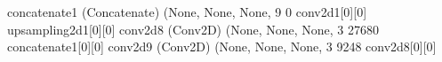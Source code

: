 \documentclass[letterpaper,10pt,english]{sphinxmanual}
\begin{document}
\begin{sphinxVerbatim}[commandchars=\\\{\}]
concatenate\PYGZus{}1 (Concatenate)     (None, None, None, 9 0           conv2d\PYGZus{}1[0][0]                   
                                                                 up\PYGZus{}sampling2d\PYGZus{}1[0][0]            
\PYGZus{}\PYGZus{}\PYGZus{}\PYGZus{}\PYGZus{}\PYGZus{}\PYGZus{}\PYGZus{}\PYGZus{}\PYGZus{}\PYGZus{}\PYGZus{}\PYGZus{}\PYGZus{}\PYGZus{}\PYGZus{}\PYGZus{}\PYGZus{}\PYGZus{}\PYGZus{}\PYGZus{}\PYGZus{}\PYGZus{}\PYGZus{}\PYGZus{}\PYGZus{}\PYGZus{}\PYGZus{}\PYGZus{}\PYGZus{}\PYGZus{}\PYGZus{}\PYGZus{}\PYGZus{}\PYGZus{}\PYGZus{}\PYGZus{}\PYGZus{}\PYGZus{}\PYGZus{}\PYGZus{}\PYGZus{}\PYGZus{}\PYGZus{}\PYGZus{}\PYGZus{}\PYGZus{}\PYGZus{}\PYGZus{}\PYGZus{}\PYGZus{}\PYGZus{}\PYGZus{}\PYGZus{}\PYGZus{}\PYGZus{}\PYGZus{}\PYGZus{}\PYGZus{}\PYGZus{}\PYGZus{}\PYGZus{}\PYGZus{}\PYGZus{}\PYGZus{}\PYGZus{}\PYGZus{}\PYGZus{}\PYGZus{}\PYGZus{}\PYGZus{}\PYGZus{}\PYGZus{}\PYGZus{}\PYGZus{}\PYGZus{}\PYGZus{}\PYGZus{}\PYGZus{}\PYGZus{}\PYGZus{}\PYGZus{}\PYGZus{}\PYGZus{}\PYGZus{}\PYGZus{}\PYGZus{}\PYGZus{}\PYGZus{}\PYGZus{}\PYGZus{}\PYGZus{}\PYGZus{}\PYGZus{}\PYGZus{}\PYGZus{}\PYGZus{}\PYGZus{}
conv2d\PYGZus{}8 (Conv2D)               (None, None, None, 3 27680       concatenate\PYGZus{}1[0][0]              
\PYGZus{}\PYGZus{}\PYGZus{}\PYGZus{}\PYGZus{}\PYGZus{}\PYGZus{}\PYGZus{}\PYGZus{}\PYGZus{}\PYGZus{}\PYGZus{}\PYGZus{}\PYGZus{}\PYGZus{}\PYGZus{}\PYGZus{}\PYGZus{}\PYGZus{}\PYGZus{}\PYGZus{}\PYGZus{}\PYGZus{}\PYGZus{}\PYGZus{}\PYGZus{}\PYGZus{}\PYGZus{}\PYGZus{}\PYGZus{}\PYGZus{}\PYGZus{}\PYGZus{}\PYGZus{}\PYGZus{}\PYGZus{}\PYGZus{}\PYGZus{}\PYGZus{}\PYGZus{}\PYGZus{}\PYGZus{}\PYGZus{}\PYGZus{}\PYGZus{}\PYGZus{}\PYGZus{}\PYGZus{}\PYGZus{}\PYGZus{}\PYGZus{}\PYGZus{}\PYGZus{}\PYGZus{}\PYGZus{}\PYGZus{}\PYGZus{}\PYGZus{}\PYGZus{}\PYGZus{}\PYGZus{}\PYGZus{}\PYGZus{}\PYGZus{}\PYGZus{}\PYGZus{}\PYGZus{}\PYGZus{}\PYGZus{}\PYGZus{}\PYGZus{}\PYGZus{}\PYGZus{}\PYGZus{}\PYGZus{}\PYGZus{}\PYGZus{}\PYGZus{}\PYGZus{}\PYGZus{}\PYGZus{}\PYGZus{}\PYGZus{}\PYGZus{}\PYGZus{}\PYGZus{}\PYGZus{}\PYGZus{}\PYGZus{}\PYGZus{}\PYGZus{}\PYGZus{}\PYGZus{}\PYGZus{}\PYGZus{}\PYGZus{}\PYGZus{}\PYGZus{}
conv2d\PYGZus{}9 (Conv2D)               (None, None, None, 3 9248        conv2d\PYGZus{}8[0][0]                   
\PYGZus{}\PYGZus{}\PYGZus{}\PYGZus{}\PYGZus{}\PYGZus{}\PYGZus{}\PYGZus{}\PYGZus{}\PYGZus{}\PYGZus{}\PYGZus{}\PYGZus{}\PYGZus{}\PYGZus{}\PYGZus{}\PYGZus{}\PYGZus{}\PYGZus{}\PYGZus{}\PYGZus{}\PYGZus{}\PYGZus{}\PYGZus{}\PYGZus{}\PYGZus{}\PYGZus{}\PYGZus{}\PYGZus{}\PYGZus{}\PYGZus{}\PYGZus{}\PYGZus{}\PYGZus{}\PYGZus{}\PYGZus{}\PYGZus{}\PYGZus{}\PYGZus{}\PYGZus{}\PYGZus{}\PYGZus{}\PYGZus{}\PYGZus{}\PYGZus{}\PYGZus{}\PYGZus{}\PYGZus{}\PYGZus{}\PYGZus{}\PYGZus{}\PYGZus{}\PYGZus{}\PYGZus{}\PYGZus{}\PYGZus{}\PYGZus{}\PYGZus{}\PYGZus{}\PYGZus{}\PYGZus{}\PYGZus{}\PYGZus{}\PYGZus{}\PYGZus{}\PYGZus{}\PYGZus{}\PYGZus{}\PYGZus{}\PYGZus{}\PYGZus{}\PYGZus{}\PYGZus{}\PYGZus{}\PYGZus{}\PYGZus{}\PYGZus{}\PYGZus{}\PYGZus{}\PYGZus{}\PYGZus{}\PYGZus{}\PYGZus{}\PYGZus{}\PYGZus{}\PYGZus{}\PYGZus{}\PYGZus{}\PYGZus{}\PYGZus{}\PYGZus{}\PYGZus{}\PYGZus{}\PYGZus{}\PYGZus{}\PYGZus{}\PYGZus{}\PYGZus{}

\end{sphinxVerbatim}
\end{document}

